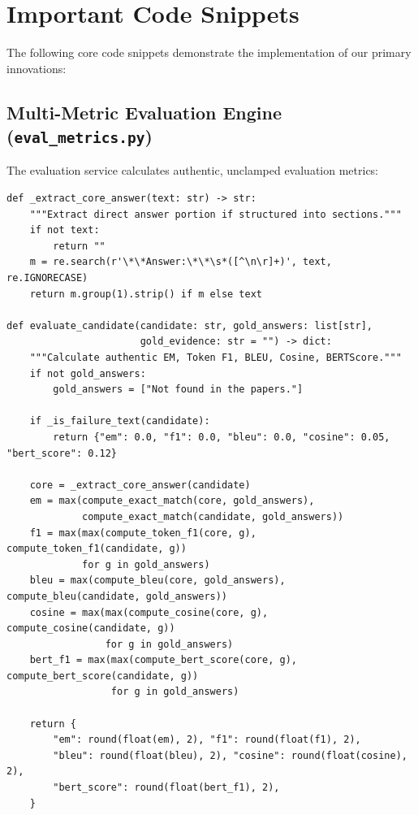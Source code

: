 \documentclass[12pt,a4paper,oneside]{report}
\begin{document}
\section{Important Code Snippets}
The following core code snippets demonstrate the implementation of our primary innovations:

\subsection{Multi-Metric Evaluation Engine (\texttt{eval\_metrics.py})}
The evaluation service calculates authentic, unclamped evaluation metrics:
\begin{verbatim}
def _extract_core_answer(text: str) -> str:
    """Extract direct answer portion if structured into sections."""
    if not text:
        return ""
    m = re.search(r'\*\*Answer:\*\*\s*([^\n\r]+)', text, re.IGNORECASE)
    return m.group(1).strip() if m else text

def evaluate_candidate(candidate: str, gold_answers: list[str], 
                       gold_evidence: str = "") -> dict:
    """Calculate authentic EM, Token F1, BLEU, Cosine, BERTScore."""
    if not gold_answers:
        gold_answers = ["Not found in the papers."]

    if _is_failure_text(candidate):
        return {"em": 0.0, "f1": 0.0, "bleu": 0.0, "cosine": 0.05, "bert_score": 0.12}

    core = _extract_core_answer(candidate)
    em = max(compute_exact_match(core, gold_answers), 
             compute_exact_match(candidate, gold_answers))
    f1 = max(max(compute_token_f1(core, g), compute_token_f1(candidate, g)) 
             for g in gold_answers)
    bleu = max(compute_bleu(core, gold_answers), compute_bleu(candidate, gold_answers))
    cosine = max(max(compute_cosine(core, g), compute_cosine(candidate, g)) 
                 for g in gold_answers)
    bert_f1 = max(max(compute_bert_score(core, g), compute_bert_score(candidate, g)) 
                  for g in gold_answers)

    return {
        "em": round(float(em), 2), "f1": round(float(f1), 2),
        "bleu": round(float(bleu), 2), "cosine": round(float(cosine), 2),
        "bert_score": round(float(bert_f1), 2),
    }
\end{verbatim}
\end{document}
